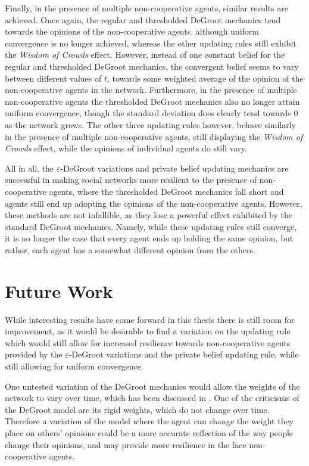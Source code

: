 \documentclass{article}
\begin{document}
\noindent Finally, in the presence of multiple non-cooperative agents, similar results are achieved. Once again, the regular and thresholded DeGroot mechanics tend towards the opinions of the non-cooperative agents, although uniform convergence is no longer achieved, whereas the other updating rules still exhibit the \emph{Wisdom of Crowds} effect. However, instead of one constant belief for the regular and thresholded DeGroot mechanics, the convergent belief seems to vary between different values of $t$, towards some weighted average of the opinion of the non-cooperative agents in the network. Furthermore, in the presence of multiple non-cooperative agents the thresholded DeGroot mechanics also no longer attain uniform convergence, though the standard deviation does clearly tend towards $0$ as the network grows. The other three updating rules however, behave similarly in the presence of multiple non-cooperative agents, still displaying the \emph{Wisdom of Crowds} effect, while the opinions of individual agents do still vary.

\noindent All in all, the $\varepsilon$-DeGroot variations and private belief updating mechanics are successful in making social networks more resilient to the presence of non-cooperative agents, where the thresholded DeGroot mechanics fall short and agents still end up adopting the opinions of the non-cooperative agents. However, these methods are not infallible, as they lose a powerful effect exhibited by the standard DeGroot mechanics. Namely, while these updating rules still converge, it is no longer the case that every agent ends up holding the same opinion, but rather, each agent has a somewhat different opinion from the others.

\section{Future Work}

While interesting results have come forward in this thesis there is still room for improvement, as it would be desirable to find a variation on the updating rule which would still allow for increased resilience towards non-cooperative agents provided by the $\varepsilon$-DeGroot variations and the private belief updating rule, while still allowing for uniform convergence.

\noindent One untested variation of the DeGroot mechanics would allow the weights of the network to vary over time, which has been discussed in \cite{chatterjee1977stochastic}. One of the criticisms of the DeGroot model are its rigid weights, which do not change over time. Therefore a variation of the model where the agent can change the weight they place on others' opinions could be a more accurate reflection of the way people change their opinions, and may provide more resilience in the face non-cooperative agents.
\end{document}
